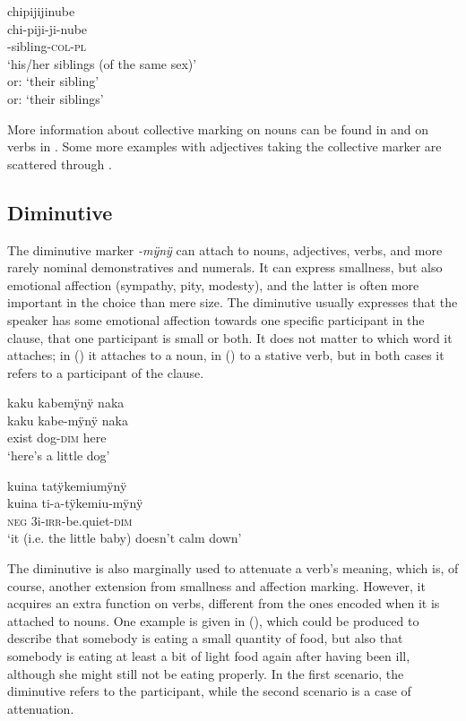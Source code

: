 \ea\label{ex:FirstCol-3}
\begingl
\glpreamble chipijijinube\\
\gla chi-piji-ji-nube\\
-sibling-\textsc{col}-\textsc{pl}\\
\glft ‘his/her siblings (of the same sex)’\\or: ‘their sibling’\\or: ‘their siblings’
\endgl
\xe

More information about collective marking on nouns can be found in  and on verbs in . Some more examples with adjectives taking the collective marker are scattered through .

\subsection{Diminutive}\label{sec:AffClDiminutive}

The diminutive marker \textit{-mÿnÿ} can attach to nouns, adjectives, verbs, and more rarely nominal demonstratives and numerals. It can express smallness, but also emotional affection (sympathy, pity, modesty), and the latter is often more important in the choice than mere size. The diminutive usually expresses that the speaker has some emotional affection towards one specific participant in the clause, that one participant is small or both. It does not matter to which word it attaches; in () it attaches to a noun, in () to a stative verb, but in both cases it refers to a participant of the clause.


\ea\label{ex:FirstDim-1}
\begingl
\glpreamble kaku kabemÿnÿ naka\\
\gla kaku kabe-mÿnÿ naka\\
\glb exist dog-\textsc{dim} here\\
\glft ‘here’s a little dog’
\endgl
\trailingcitation{[mox-a110920l-2.007]}
\xe


\ea\label{ex:FirstDim-2}
\begingl
\glpreamble kuina tatÿkemiumÿnÿ\\
\gla kuina ti-a-tÿkemiu-mÿnÿ\\
\glb \textsc{neg} 3i-\textsc{irr}-be.quiet-\textsc{dim}\\
\glft ‘it (i.e. the little baby) doesn’t calm down’
\endgl
\trailingcitation{[jxx-e120430l-4.04]}
\xe


The diminutive is also marginally used to attenuate a verb’s meaning, which is, of course, another extension from smallness and affection marking. However, it acquires an extra function on verbs, different from the ones encoded when it is attached to nouns. One example is given in (), which could be produced to describe that somebody is eating a small quantity of food, but also that somebody is eating at least a bit of light food again after having been ill, although she might still not be eating properly. In the first scenario, the diminutive refers to the  participant, while the second scenario is a case of attenuation.

